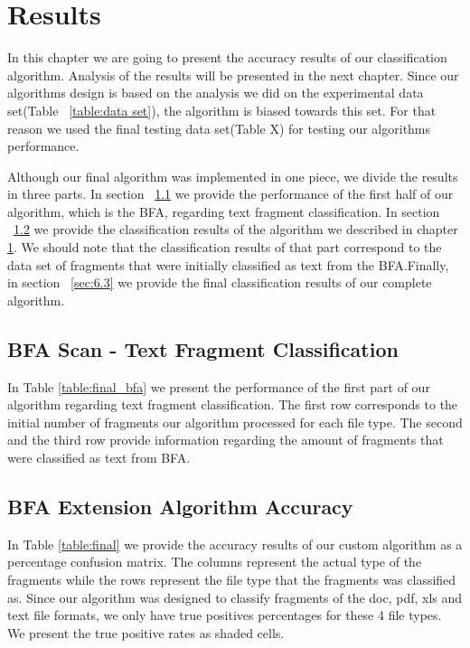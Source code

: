 \chapter{Results}\label{chap:6}
In this chapter we are going to present the accuracy results of our classification algorithm. Analysis of the results will be presented in the next chapter.
Since our algorithms design is based on the analysis we did on the experimental data set(Table ~\ref{table:data set}), the algorithm is biased towards this set. For that reason we used the final testing data set(Table X) for testing our algorithms performance.

Although our final algorithm was implemented in one piece, we divide the results in three parts. In section ~\ref{sec:6.1} we  provide the performance of the first half of our algorithm, which is the BFA, regarding text fragment classification. In section ~\ref{sec:6.2} we provide the classification results of the algorithm we described in chapter \ref{chap:6}. We should note that the classification results of that part correspond to the data set of fragments that were initially classified as text from the BFA.Finally, in section ~\ref{sec:6.3} we provide the final classification results of our complete algorithm. 
\pagebreak

\section{BFA Scan - Text Fragment Classification}\label{sec:6.1}
In Table \ref{table:final_bfa} we present the performance of the first part of our algorithm regarding text fragment classification. The first row corresponds to the initial number of fragments our algorithm processed for each file type. The second and the third row provide information regarding the amount of fragments that were classified as text from BFA.





\section{BFA Extension Algorithm Accuracy}\label{sec:6.2}
In Table \ref{table:final} we provide the accuracy results of our custom  algorithm as a percentage confusion matrix. The columns represent the actual type of the fragments while the rows represent the file type that the fragments was classified as. Since our algorithm was designed to classify fragments of the doc, pdf, xls and text file formats, we only have true positives percentages for these 4 file types. We present the true positive rates as shaded cells.

